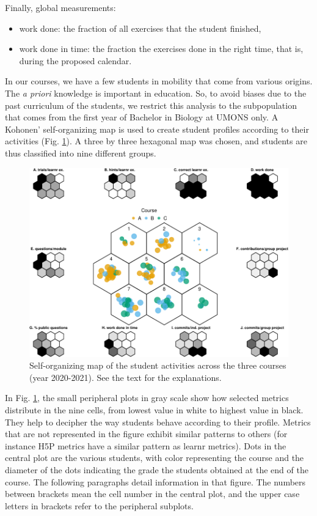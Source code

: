 \documentclass{aims}
\theoremstyle{definition}
\begin{document}
Finally, global measurements:

\begin{itemize}
\item
  work done: the fraction of all exercises that the student finished,
\item
  work done in time: the fraction the exercises done in the right time,
  that is, during the proposed calendar.
\end{itemize}

In our courses, we have a few students in mobility that come from
various origins. The \emph{a priori} knowledge is important in
education. So, to avoid biases due to the past curriculum of the
students, we restrict this analysis to the subpopulation that comes from
the first year of Bachelor in Biology at UMONS only. A Kohonen'
self-organizing map is used to create student profiles according to
their activities (Fig. \ref {fig:fig_som}). A three by three hexagonal
map was chosen, and students are thus classified into nine different
groups.

\begin{figure}
\includegraphics[width=1\linewidth]{teaching_data_science_files/figure-latex/fig_som-1} \caption{\label{fig:fig_som} Self-organizing map of the student activities across the three courses (year 2020-2021). See the text for the explanations.}\label{fig:fig_som}
\end{figure}

In Fig. \ref {fig:fig_som}, the small peripheral plots in gray scale
show how selected metrics distribute in the nine cells, from lowest
value in white to highest value in black. They help to decipher the way
students behave according to their profile. Metrics that are not
represented in the figure exhibit similar patterns to others (for
instance H5P metrics have a similar pattern as learnr metrics). Dots in
the central plot are the various students, with color representing the
course and the diameter of the dots indicating the grade the students
obtained at the end of the course. The following paragraphs detail
information in that figure. The numbers between brackets mean the cell
number in the central plot, and the upper case letters in brackets refer
to the peripheral subplots.
\end{document}
